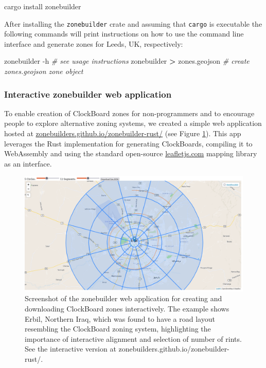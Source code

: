 \documentclass{josis}
\newenvironment{Shaded}{\begin{snugshade}}{\end{snugshade}}
\newcommand{\AttributeTok}[1]{\textcolor[rgb]{0.77,0.63,0.00}{#1}}
\newcommand{\CommentTok}[1]{\textcolor[rgb]{0.56,0.35,0.01}{\textit{#1}}}
\newcommand{\ExtensionTok}[1]{#1}
\newcommand{\NormalTok}[1]{#1}
\newcommand{\OperatorTok}[1]{\textcolor[rgb]{0.81,0.36,0.00}{\textbf{#1}}}
\begin{document}
\begin{Shaded}
\begin{Highlighting}[]
\ExtensionTok{cargo}\NormalTok{ install zonebuilder}
\end{Highlighting}
\end{Shaded}

After installing the \texttt{zonebuilder} crate and assuming that \texttt{cargo} is executable the following commands will print instructions on how to use the command line interface and generate zones for Leeds, UK, respectively:

\begin{Shaded}
\begin{Highlighting}[]
\ExtensionTok{zonebuilder} \AttributeTok{{-}h}               \CommentTok{\# see usage instructions}
\ExtensionTok{zonebuilder} \OperatorTok{\textgreater{}}\NormalTok{ zones.geojson  }\CommentTok{\# create zones.geojson zone object}
\end{Highlighting}
\end{Shaded}

\hypertarget{interactive-zonebuilder-web-application}{%
\subsubsection{Interactive zonebuilder web application}\label{interactive-zonebuilder-web-application}}

To enable creation of ClockBoard zones for non-programmers and to encourage people to explore alternative zoning systems, we created a simple web application hosted at \href{https://zonebuilders.github.io/zonebuilder-rust/}{zonebuilders.github.io/zonebuilder-rust/} (see Figure \ref{fig:interactive}). This app leverages the Rust implementation for generating ClockBoards, compiling it to WebAssembly and using the standard open-source \href{https://leafletjs.com}{leafletjs.com} mapping library as an interface.

\begin{figure}

{\centering \includegraphics[width=0.85\linewidth]{128508694-5b5485ca-6f1b-4c21-bdb6-9269a7981dd5} 

}

\caption{Screenshot of the zonebuilder web application for creating and downloading ClockBoard zones interactively. The example shows Erbil, Northern Iraq, which was found to have a road layout resembling the ClockBoard zoning system, highlighting the importance of interactive alignment and selection of number of rints. See the interactive version at zonebuilders.github.io/zonebuilder-rust/.}\label{fig:interactive}
\end{figure}
\end{document}
